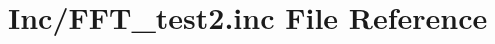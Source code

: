 \hypertarget{_f_f_t__test2_8inc}{}\section{Inc/\+F\+F\+T\+\_\+test2.inc File Reference}
\label{_f_f_t__test2_8inc}
